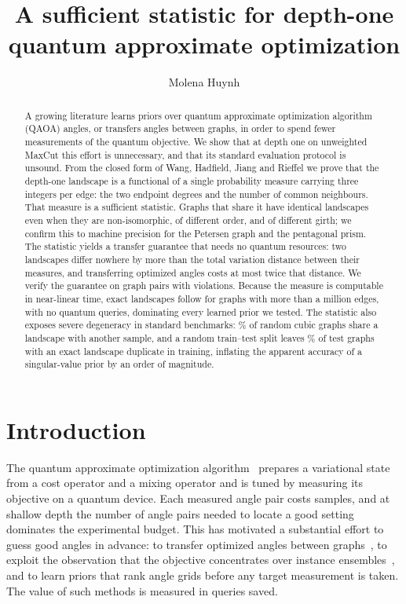 \documentclass[10pt,letterpaper]{article}
\theoremstyle{definition}
\begin{document}
\title{A sufficient statistic for depth-one quantum approximate optimization}
\author{Molena Huynh}
\maketitle

\begin{abstract}
A growing literature learns priors over quantum approximate optimization
algorithm (QAOA) angles, or transfers angles between graphs, in order to spend
fewer measurements of the quantum objective. We show that at depth one on
unweighted MaxCut this effort is unnecessary, and that its standard evaluation
protocol is unsound. From the closed form of Wang, Hadfield, Jiang and Rieffel
we prove that the depth-one landscape is a functional of a single probability
measure carrying three integers per edge: the two endpoint degrees and the
number of common neighbours. That measure is a sufficient statistic. Graphs
that share it have identical landscapes even when they are non-isomorphic, of
different order, and of different girth; we confirm this to machine precision
for the Petersen graph and the pentagonal prism. The statistic yields a
transfer guarantee that needs no quantum resources: two landscapes differ
nowhere by more than the total variation distance between their measures, and
transferring optimized angles costs at most twice that distance. We verify the
guarantee on \XPairs{} graph pairs with \XViol{} violations. Because the
measure is computable in near-linear time, exact landscapes follow for graphs
with more than a million edges, with no quantum queries, dominating every
learned prior we tested. The statistic also exposes severe degeneracy in
standard benchmarks: \RegShareThree\% of random cubic graphs share a landscape
with another sample, and a random train--test split leaves \NaiveLeakPct\% of
test graphs with an exact landscape duplicate in training, inflating the
apparent accuracy of a singular-value prior by an order of magnitude.
\end{abstract}

\section{Introduction}

The quantum approximate optimization algorithm~\cite{farhi2014qaoa,
hadfield2019alternating} prepares a variational state from a cost operator and
a mixing operator and is tuned by measuring its objective on a quantum device.
Each measured angle pair costs samples, and at shallow depth the number of
angle pairs needed to locate a good setting dominates the experimental budget.
This has motivated a substantial effort to guess good angles in advance: to
transfer optimized angles between graphs~\cite{galda2021transfer,
shaydulin2023transfer}, to exploit the observation that the objective
concentrates over instance ensembles~\cite{brandao2018fixed}, and to learn
priors that rank angle grids before any target measurement is taken. The value
of such methods is measured in queries saved.
\end{document}
